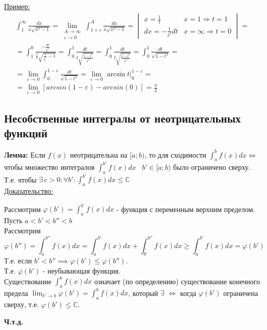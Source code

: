 \documentclass[12pt]{article}
\begin{document}
    \underline{Пример:}
    \begin{gather*}
        \int_{1}^{\infty}\frac{dx}{x\sqrt{x^2-1}}=\lim_{\substack{A \to \infty \\ \varepsilon \to 0}} \int_{1+\varepsilon}^{A} \frac{dx}{x\sqrt{x^2-1}} =
        \begin{vmatrix}
            x=\frac{1}{t} & x=1 \Rightarrow t=1\\
            dx=-\frac{1}{t^2}dt & x=\infty \Rightarrow t=0
        \end{vmatrix} =\\
        = \int_{1}^{0} \frac{-\frac{dt}{t^2}}{\frac{1}{t}\sqrt{\frac{1}{t^2}-1}}=\int_{0}^{1}\frac{dt}{t\sqrt{\frac{1-t^2}{t^2}}} = \int_{0}^{1} \frac{dt}{t\sqrt{\frac{1-t^2}{t^2}}} = \int_{0}^{1}\frac{dt}{\sqrt{1-t^2}} =\\
        = \lim_{\varepsilon \to 0} \int_{0}^{1-\varepsilon}\frac{dt}{\sqrt{1-t^2}}=\lim_{\varepsilon \to 0} \arcsin t\Big|^{1-\varepsilon}_0=\\
        = \lim_{\varepsilon \to 0}[arcsin(1-\varepsilon)-arcsin(0)]=\frac{\pi}{2}
    \end{gather*}

    \subsection{Несобственные интегралы от неотрицательных функций}\noindent
    \textbf{Лемма:} Если $f(x)$ неотрицательна на $[a;b)$, то для сходимости $\int_{a}^{b}f(x)dx \Longleftrightarrow $ чтобы множество интегралов $\int_{a}^{b'} f(x)dx \;\;\; b' \in [a;b)$ было ограничено сверху.\\
    Т.е. чтобы $\exists\,c>0:\forall b':\int_{a}^{b'}f(x)dx \leq \mathbb{C}$\\
    \underline{Доказательство:}
    \begin{adjustwidth}{1.5em}{1.5em}
        Рассмотрим $\varphi(b') = \int_{a}^{b'} f(x)dx$ - функция с переменным верхним пределом.\\
        Пусть $a<b'<b''<b$\\
        Рассмотрим 
        \[ \varphi(b'')=\int_{a}^{b''}f(x)dx = \int_{a}^{b'}f(x)dx+\int_{b'}^{b''}f(x)dx\geq \int_{a}^{b'}f(x)dx=\varphi(b')\]
        Т.е. если $b'<b'' \implies \varphi(b')\leq \varphi(b'')$.\\
        Т.е. $\varphi(b')$ - неубывающая функция.\\
        Существование $\int_{a}^{b}f(x)dx$ означает (по определению) существование конечного предела $\lim_{b' \to b}\varphi(b')=\int_{a}^{b}f(x)dx$, который $\exists$ $\Longleftrightarrow$ когда $\varphi(b')$
        ограничена сверху, т.е. $\varphi(b') \leq \mathbb{C}$.
        \begin{center}
            \textbf{Ч.т.д.}
        \end{center}
    \end{adjustwidth}
\end{document}
